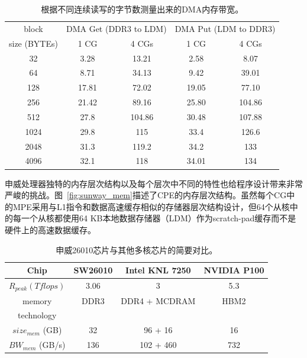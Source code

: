 \documentclass[degree=doctor]{thuthesis}
\begin{document}
\begin{table}[ht]
\small
\caption{根据不同连续读写的字节数测量出来的DMA内存带宽。}
\label{tb:sw-bw}
\centering
\begin{tabular}{ccccc}
\hline\hline
  block & \multicolumn{2}{c}{DMA Get (DDR3 to LDM)} & \multicolumn{2}{c}{DMA Put (LDM to DDR3)} \\
  size (BYTEs) & 1 CG & 4 CGs & 1 CG & 4 CGs \\\hline
  32 & 3.28 & 13.21 & 2.58 & 8.07 \\
  64 & 8.71 & 34.13 & 9.42 & 39.01 \\
  128 & 17.81 & 72.02 & 19.05 & 77.10 \\
  256 & 21.42 & 89.16 & 25.80 & 104.86 \\
  512 & 27.8 & 104.86 & 30.48 & 107.88 \\
  1024 & 29.8 & 115 & 33.4 & 126.6 \\
  2048 & 31.3 & 119.2 & 34.2 & 133 \\
  4096 & 32.1 & 118 & 34.01 & 134 \\
  \hline
\end{tabular}
\end{table}



申威处理器独特的内存层次结构以及每个层次中不同的特性也给程序设计带来非常严峻的挑战。图~\ref {fig:sunway_mem}描述了CPE的内存层次结构。虽然每个CG中的MPE采用与L1指令和数据高速缓存相似的存储器层次结构设计，但64个从核中的每一个从核都使用64 KB本地数据存储器（LDM）作为scratch-pad缓存而不是硬件上的高速数据缓存。




\begin{table}[ht]
\caption{申威26010芯片与其他多核芯片的简要对比。}
\label{tb:proc-comp}
\centering
\begin{tabular*}{0.8\columnwidth}{cccc}
\hline\hline
  Chip & SW26010 & Intel KNL 7250 & NVIDIA P100 \\\hline
    $R_{peak} (Tflops)$ & 3.06 & 3 & 5.3 \\\hline
    memory   & DDR3 & DDR4 + MCDRAM & HBM2 \\
    technology \\\hline
    $size_{mem}$ (GB) & 32 & 96 + 16 & 16 \\\hline
    $BW_{mem}$ (GB/s)  & 136 & 102 + 460 & 732 \\\hline
\hline
\end{tabular*}
\end{table}
\end{document}
